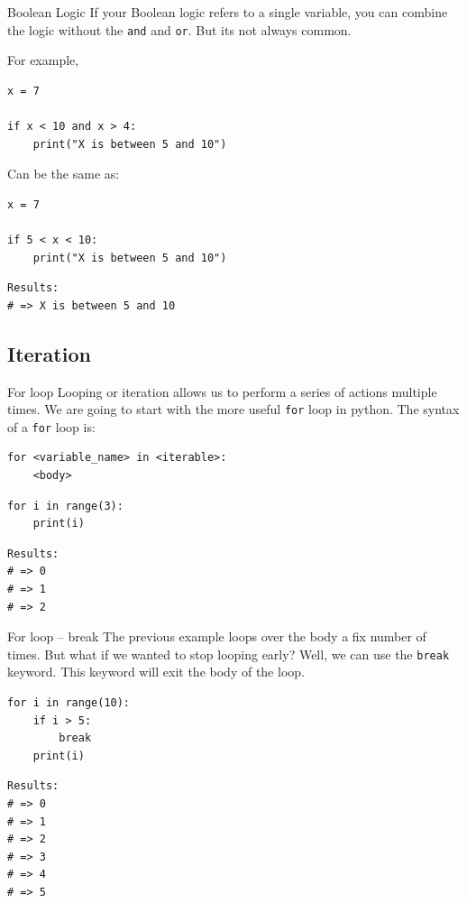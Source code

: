 \documentclass[10pt]{beamer}
\begin{document}
\begin{frame}[label={sec:org051b5be},fragile]{Boolean Logic}
 If your Boolean logic refers to a single variable, you can combine the logic without
the \texttt{and} and \texttt{or}. But its not always common.

For example,

\begin{verbatim}
x = 7

if x < 10 and x > 4:
    print("X is between 5 and 10")
\end{verbatim}

Can be the same as:

\begin{verbatim}
x = 7

if 5 < x < 10:
    print("X is between 5 and 10")
\end{verbatim}

\begin{verbatim}
Results: 
# => X is between 5 and 10
\end{verbatim}
\end{frame}

\subsection{Iteration}
\label{sec:orgc32111c}

\begin{frame}[label={sec:org418c106},fragile]{For loop}
 Looping or iteration allows us to perform a series of actions multiple times. We are
going to start with the more useful \texttt{for} loop in python. The syntax of a \texttt{for} loop is:

\begin{verbatim}
for <variable_name> in <iterable>:
    <body>
\end{verbatim}

\begin{verbatim}
for i in range(3):
    print(i)
\end{verbatim}

\begin{verbatim}
Results: 
# => 0
# => 1
# => 2
\end{verbatim}
\end{frame}

\begin{frame}[label={sec:org0fdc41e},fragile]{For loop -- break}
 The previous example loops over the body a fix number of times. But what if we wanted
to stop looping early? Well, we can use the \texttt{break} keyword. This keyword will exit the
body of the loop.

\begin{verbatim}
for i in range(10):
    if i > 5:
        break
    print(i)
\end{verbatim}

\begin{verbatim}
Results: 
# => 0
# => 1
# => 2
# => 3
# => 4
# => 5
\end{verbatim}
\end{frame}
\end{document}
